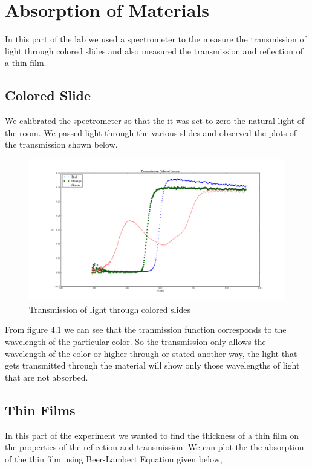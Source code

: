 \documentclass[paper=a4, fontsize=11pt]{scrartcl} %
\numberwithin{equation}{section}
\numberwithin{figure}{section}
\numberwithin{table}{section}
\begin{document}
\section{Absorption of Materials}
In this part of the lab we used a spectrometer to the measure the transmission of light through colored slides and also measured the transmission and reflection of a thin film.

\subsection{Colored Slide}
We calibrated the spectrometer so that the it was set to zero the natural light of the room. We passed light through the various slides and observed the plots of the transmission shown below.
\begin{figure}[H]
\centering
\includegraphics[scale =0.3]{lenses}
\caption{Transmission of light through colored slides}
\end{figure}
From figure 4.1 we can see that the tranmission function corresponds to the wavelength of the particular color. So the transmission only allows the wavelength of the color or higher through or stated another way, the light that gets transmitted through the material will show only those wavelengths of light that are not absorbed. 

\subsection{Thin Films}
In this part of the experiment we wanted to find the thickness of a thin film on the properties of the reflection and transmission. We can plot the the absorption of the thin film using Beer-Lambert Equation given below,
\end{document}
